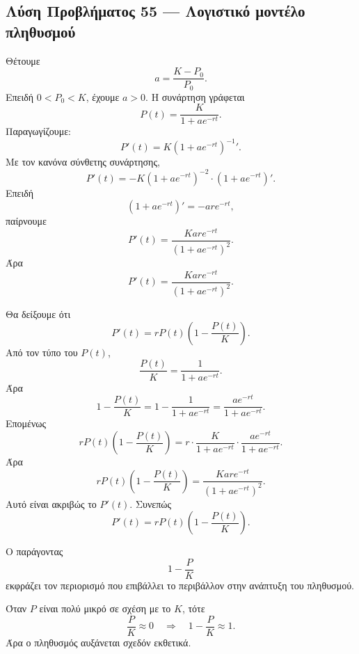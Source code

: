\subsection*{Λύση Προβλήματος 55 --- Λογιστικό μοντέλο πληθυσμού}

\begin{alist}
  \item Θέτουμε
        \[
          a=\frac{K-P_0}{P_0}.
        \]
        Επειδή \(0<P_0<K\), έχουμε \(a>0\). Η συνάρτηση γράφεται
        \[
          P(t)=\frac{K}{1+ae^{-rt}}.
        \]
        Παραγωγίζουμε:
        \[
          P'(t)
          =
          K\left(1+ae^{-rt}\right)^{-1}'.
        \]
        Με τον κανόνα σύνθετης συνάρτησης,
        \[
          P'(t)
          =
          -K\left(1+ae^{-rt}\right)^{-2}
          \cdot
          \left(1+ae^{-rt}\right)'.
        \]
        Επειδή
        \[
          \left(1+ae^{-rt}\right)'=-ar e^{-rt},
        \]
        παίρνουμε
        \[
          P'(t)
          =
          \frac{Kare^{-rt}}{\left(1+ae^{-rt}\right)^2}.
        \]
        Άρα
        \[
          {
          P'(t)=\frac{Kare^{-rt}}{\left(1+ae^{-rt}\right)^2}
          }.
        \]

  \item Θα δείξουμε ότι
        \[
          P'(t)=rP(t)\left(1-\frac{P(t)}{K}\right).
        \]
        Από τον τύπο του \(P(t)\),
        \[
          \frac{P(t)}{K}
          =
          \frac{1}{1+ae^{-rt}}.
        \]
        Άρα
        \[
          1-\frac{P(t)}{K}
          =
          1-\frac{1}{1+ae^{-rt}}
          =
          \frac{ae^{-rt}}{1+ae^{-rt}}.
        \]
        Επομένως
        \[
          rP(t)\left(1-\frac{P(t)}{K}\right)
          =
          r\cdot
          \frac{K}{1+ae^{-rt}}
          \cdot
          \frac{ae^{-rt}}{1+ae^{-rt}}.
        \]
        Άρα
        \[
          rP(t)\left(1-\frac{P(t)}{K}\right)
          =
          \frac{Kare^{-rt}}{\left(1+ae^{-rt}\right)^2}.
        \]
        Αυτό είναι ακριβώς το \(P'(t)\). Συνεπώς
        \[
          {
          P'(t)=rP(t)\left(1-\frac{P(t)}{K}\right)
          }.
        \]

  \item Ο παράγοντας
        \[
          1-\frac{P}{K}
        \]
        εκφράζει τον περιορισμό που επιβάλλει το περιβάλλον στην
        ανάπτυξη του πληθυσμού.

        Όταν \(P\) είναι πολύ μικρό σε σχέση με το \(K\), τότε
        \[
          \frac{P}{K}\approx0
          \quad\Rightarrow\quad
          1-\frac{P}{K}\approx1.
        \]
        Άρα ο πληθυσμός αυξάνεται σχεδόν εκθετικά.


\end{alist}
